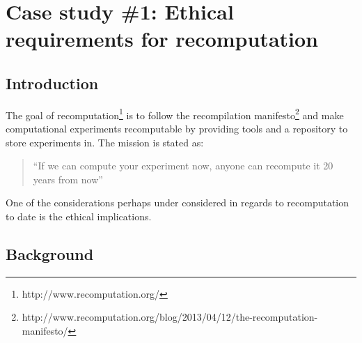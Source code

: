 

% 

\section{Case study \#1: Ethical requirements for recomputation}

\subsection{Introduction}
The goal of recomputation\footnote{http://www.recomputation.org/} is to follow the recompilation manifesto\footnote{http://www.recomputation.org/blog/2013/04/12/the-recomputation-manifesto/} and make computational experiments recomputable by providing tools and a repository to store experiments in. The mission is stated as:
\begin{quote}
``If we can compute your experiment now, anyone can recompute it 20 years from now''
\end{quote}

One of the considerations perhaps under considered in regards to recomputation to date is the ethical implications. 
\subsection{Background}

